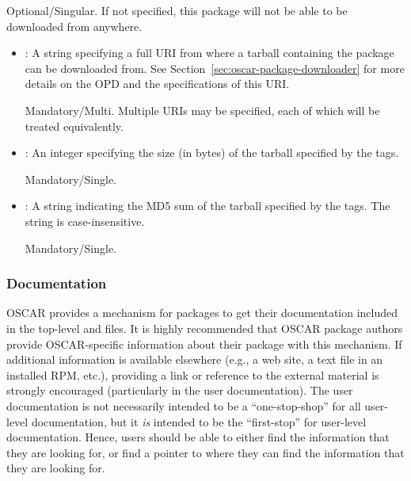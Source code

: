 \begin{itemize}
  Optional/Singular.  If not specified, this package will not be able
  to be downloaded from anywhere. 

  \begin{itemize}
  \item {}: A string specifying a full URI from where a
    tarball containing the package can be downloaded from.  See
    Section~\ref{sec:oscar-package-downloader} for more details on the
    OPD and the specifications of this URI.

    Mandatory/Multi.  Multiple URIs may be specified, each of which
    will be treated equivalently.  
    
  \item {}: An integer specifying the size (in bytes) of
    the tarball specified by the  tags.

    Mandatory/Single.
    
  \item {}: A string indicating the MD5 sum of the
    tarball specified by the  tags.  The string is
    case-insensitive. 
    
    Mandatory/Single.
  \end{itemize}
\end{itemize}

\endchange


\subsubsection{Documentation}
\label{sec:design-pkg-docs}

OSCAR provides a mechanism for packages to get their documentation
included in the top-level  and 
files.  It is highly recommended that OSCAR package authors provide
OSCAR-specific information about their package with this mechanism.
If additional information is available elsewhere (e.g., a web site, a
text file in an installed RPM, etc.), providing a link or reference to
the external material is strongly encouraged (particularly in the user
documentation).  The user documentation is not necessarily intended to
be a ``one-stop-shop'' for all user-level documentation, but it {\em
  is} intended to be the ``first-stop'' for user-level documentation.
Hence, users should be able to either find the information that they
are looking for, or find a pointer to where they can find the
information that they are looking for.

